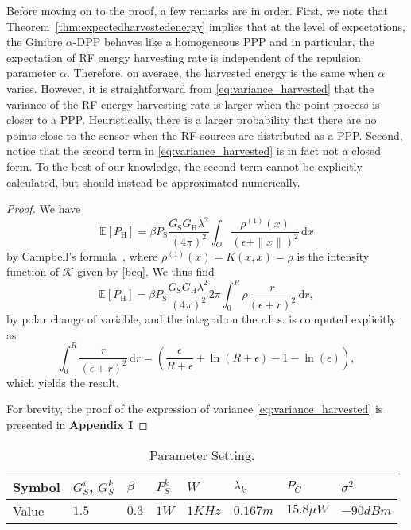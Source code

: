 \documentclass[12pt,draftclsnofoot,onecolumn]{IEEEtran}
\begin{document}
Before moving on to the proof, a few remarks are in order. First, we note that Theorem~\ref{thm:expectedharvestedenergy} implies that at the level of expectations, the Ginibre $\alpha$-DPP behaves like a homogeneous PPP and in particular, the expectation of RF energy harvesting rate is independent of the repulsion parameter $\alpha$. Therefore, on average, the harvested energy is the same when $\alpha$ varies. However, it is straightforward from \eqref{eq:variance_harvested} that the variance of the RF energy harvesting rate is larger when the point process is closer to a PPP. Heuristically, there is a larger probability that there are no points close to the sensor when the RF sources are distributed as a PPP. 
Second, notice that the second term in \eqref{eq:variance_harvested} is in fact not a closed form. To the best of our knowledge, the second term cannot be explicitly calculated, but should instead be approximated numerically.
\begin{proof}
We have
\begin{equation*}
\mathbb{E}[P_{\mathrm H}]=\beta P_{\mathrm{S}} \frac{G_{\mathrm{S}}G_{\mathrm{H}} \lambda^{2}}{(4\pi )^{2}} \int_{O} \frac{\rho^{(1)}(x)}{(\epsilon+\|x\|)^2}\,\mathrm{d}x
\end{equation*}
by Campbell's formula~\cite{Kallenberg}, where 
$\rho^{(1)}(x)=K(x,x)=\rho$ 
 is the intensity function of $\mathcal{K}$ given by \eqref{beq}.
We thus find
\begin{equation*}
\mathbb{E}[P_{\mathrm H}]=\beta  P_{\mathrm{S}} \frac{G_{\mathrm{S}}G_{\mathrm{H}}  \lambda^{2}}{(4\pi )^{2}} 2 \pi \int_{0}^R \rho \frac{r}{(\epsilon+r)^2}\,\mathrm{d}r,
\end{equation*}
 by polar change of variable,
 and the integral on the r.h.s. is computed explicitly as
\begin{equation*}
 \int_{0}^R\frac{r}{(\epsilon+r)^2}\,\mathrm{d}r=
\left(\frac{\epsilon}{R+\epsilon}+\ln(R+\epsilon)-1-\ln(\epsilon)\right),
\end{equation*}
which yields the result.

For brevity, the proof of the expression of variance \eqref{eq:variance_harvested} is presented in {\bf Appendix I}
\end{proof}



\begin{table}
\centering
\caption{\footnotesize Parameter Setting.} \label{parameter_setting}
\begin{tabular}{|l|l|l|l|l|l|l|l|} 
\hline
Symbol & $G^{i}_{S}$, $G^{k}_{S}$ & $\beta$  & $P^{k}_{S}$ & $W$ & $\lambda_{k}$ & $P_{C}$ & $\sigma^2$ \\ 
\hline
Value  & $1.5$ &  $0.3$ & $1W$  & $1KHz$  &  $0.167m$ & $15.8\mu W$ & $-90dBm$ \\
\hline              
\end{tabular}
\end{table}
\end{document}
